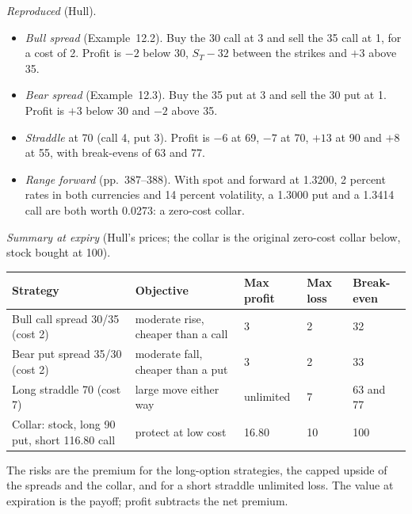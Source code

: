 \begin{qfmethod}
 \emph{Reproduced} (Hull).
\begin{itemize}
\item \emph{Bull spread} (Example~12.2). Buy the 30 call at 3 and sell the 35 call at 1, for a cost of 2. Profit is $-2$ below 30, $S_T-32$ between the strikes and $+3$ above 35.
\item \emph{Bear spread} (Example~12.3). Buy the 35 put at 3 and sell the 30 put at 1. Profit is $+3$ below 30 and $-2$ above 35.
\item \emph{Straddle} at 70 (call 4, put 3). Profit is $-6$ at 69, $-7$ at 70, $+13$ at 90 and $+8$ at 55, with break-evens of 63 and 77.
\item \emph{Range forward} (pp.~387--388). With spot and forward at 1.3200, 2 percent rates in both currencies and 14 percent volatility, a 1.3000 put and a 1.3414 call are both worth 0.0273: a zero-cost collar.
\end{itemize}

\emph{Summary at expiry} (Hull's prices; the collar is the original zero-cost collar below, stock bought at 100).
\begin{center}\small
\begin{tabular}{@{}lllll@{}}
\toprule
Strategy & Objective & Max profit & Max loss & Break-even \\
\midrule
Bull call spread 30/35 (cost 2) & moderate rise, cheaper than a call & 3 & 2 & 32 \\
Bear put spread 35/30 (cost 2) & moderate fall, cheaper than a put & 3 & 2 & 33 \\
Long straddle 70 (cost 7) & large move either way & unlimited & 7 & 63 and 77 \\
Collar: stock, long 90 put, short 116.80 call & protect at low cost & 16.80 & 10 & 100 \\
\bottomrule
\end{tabular}
\end{center}
The risks are the premium for the long-option strategies, the capped upside of the spreads and the collar, and for a short straddle unlimited loss. The value at expiration is the payoff; profit subtracts the net premium.


\end{qfmethod}
